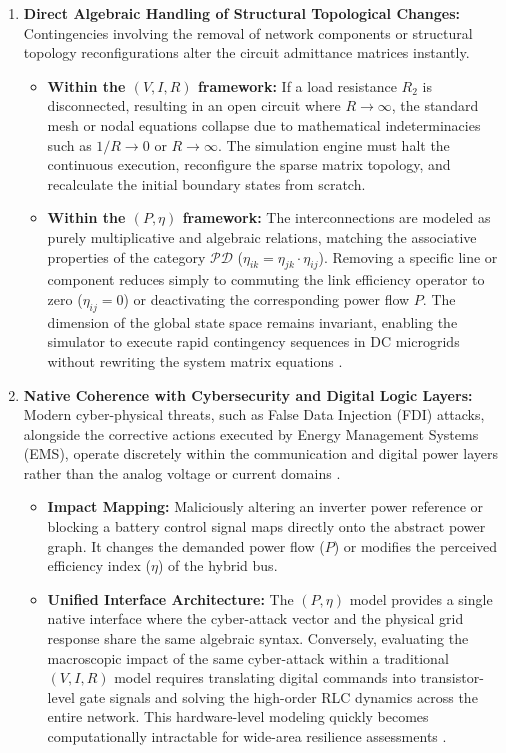\documentclass[11pt, a4paper]{article}
\begin{document}
\begin{enumerate}
    \item \textbf{Direct Algebraic Handling of Structural Topological Changes:}
    Contingencies involving the removal of network components or structural topology reconfigurations alter the circuit admittance matrices instantly.
    \begin{itemize}
        \item \textbf{Within the $(V, I, R)$ framework:} If a load resistance $R_2$ is disconnected, resulting in an open circuit where $R \to \infty$, the standard mesh or nodal equations collapse due to mathematical indeterminacies such as $1/R \to 0$ or $R \to \infty$. The simulation engine must halt the continuous execution, reconfigure the sparse matrix topology, and recalculate the initial boundary states from scratch.
        \item \textbf{Within the $(P, \eta)$ framework:} The interconnections are modeled as purely multiplicative and algebraic relations, matching the associative properties of the category $\mathcal{PD}$ ($\eta_{ik} = \eta_{jk} \cdot \eta_{ij}$). Removing a specific line or component reduces simply to commuting the link efficiency operator to zero ($\eta_{ij} = 0$) or deactivating the corresponding power flow $P$. The dimension of the global state space remains invariant, enabling the simulator to execute rapid contingency sequences in DC microgrids without rewriting the system matrix equations \cite{gonzalezdedurana2025novel}.
    \end{itemize}

    \item \textbf{Native Coherence with Cybersecurity and Digital Logic Layers:}
    Modern cyber-physical threats, such as False Data Injection (FDI) attacks, alongside the corrective actions executed by Energy Management Systems (EMS), operate discretely within the communication and digital power layers rather than the analog voltage or current domains \cite{pr13092969, sys12040109}.
    \begin{itemize}
        \item \textbf{Impact Mapping:} Maliciously altering an inverter power reference or blocking a battery control signal maps directly onto the abstract power graph. It changes the demanded power flow ($P$) or modifies the perceived efficiency index ($\eta$) of the hybrid bus.
        \item \textbf{Unified Interface Architecture:} The $(P, \eta)$ model provides a single native interface where the cyber-attack vector and the physical grid response share the same algebraic syntax. Conversely, evaluating the macroscopic impact of the same cyber-attack within a traditional $(V, I, R)$ model requires translating digital commands into transistor-level gate signals and solving the high-order RLC dynamics across the entire network. This hardware-level modeling quickly becomes computationally intractable for wide-area resilience assessments \cite{moutevelis2024taxonomy, pr13092969, sys12040109, appl14221111}.
    \end{itemize}
\end{enumerate}
\end{document}
